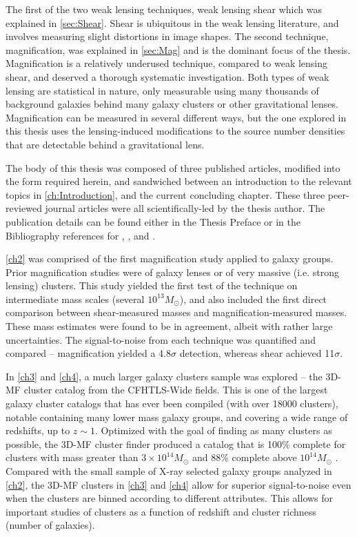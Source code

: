 The first of the two weak lensing techniques, weak lensing shear which was explained in \autoref{sec:Shear}. Shear is ubiquitous in the weak lensing literature, and involves measuring slight distortions in image shapes. The second technique, magnification, was explained in \autoref{sec:Mag} and is the dominant focus of the thesis. Magnification is a relatively underused technique, compared to weak lensing shear, and deserved a thorough systematic investigation. Both types of weak lensing are statistical in nature, only measurable using many thousands of background galaxies behind many galaxy clusters or other gravitational lenses.  Magnification can be measured in several different ways, but the one explored in this thesis uses the lensing-induced modifications to the source number densities that are detectable behind a gravitational lens.

The body of this thesis was composed of three published articles, modified into the form required herein, and sandwiched between an introduction to the relevant topics in \autoref{ch:Introduction}, and the current concluding chapter. These three peer-reviewed journal articles were all scientifically-led by the thesis author. The publication details can be found either in the Thesis Preface or in the Bibliography references for \citet{Ford12}, \citet{Ford14}, and \citet{Ford15}. 

\autoref{ch2} was comprised of the first magnification study applied to galaxy groups. Prior magnification studies were of galaxy lenses or of very massive (i.e. strong lensing) clusters. This study yielded the first test of the technique on intermediate mass scales (several $10^{13} M_{\odot}$), and also included the first direct comparison between shear-measured masses and magnification-measured masses. These mass estimates were found to be in agreement, albeit with rather large uncertainties. The signal-to-noise from each technique was quantified and compared -- magnification yielded a 4.8$\sigma$ detection, whereas shear achieved 11$\sigma$.

In \autoref{ch3} and \autoref{ch4}, a much larger galaxy clusters sample was explored -- the \ac{3D-MF} cluster catalog from the \ac{CFHTLS}-Wide fields. This is one of the largest galaxy cluster catalogs that has ever been compiled (with over 18000 clusters), notable containing many lower mass galaxy groups, and covering a wide range of redshifts, up to $z \sim 1$. Optimized with the goal of finding as many clusters as possible, the \ac{3D-MF} cluster finder produced a catalog that is 100\% complete for clusters with mass greater than $3 \times 10^{14} M_{\odot}$ and 88\% complete above $10^{14} M_{\odot}$ \citep[see \autoref{3DMF} or the original \ac{3D-MF} paper][for more details]{Milkeraitis10}. Compared with the small sample of X-ray selected galaxy groups analyzed in \autoref{ch2}, the \ac{3D-MF} clusters in \autoref{ch3} and \autoref{ch4} allow for superior signal-to-noise even when the clusters are binned according to different attributes. This allows for important studies of clusters as a function of redshift and cluster richness (number of galaxies).

